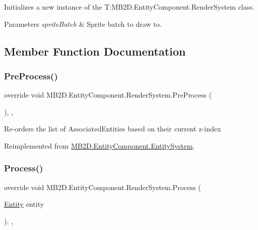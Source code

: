Initializes a new instance of the T\+:\+M\+B2\+D.\+Entity\+Component.\+Render\+System class. 


\begin{DoxyParams}{Parameters}
{\em sprite\+Batch} & Sprite batch to draw to.\\
\hline
\end{DoxyParams}


\subsection{Member Function Documentation}
\hypertarget{class_m_b2_d_1_1_entity_component_1_1_render_system_aadd36efe73a5f8cc489894232a5fc201}{}\label{class_m_b2_d_1_1_entity_component_1_1_render_system_aadd36efe73a5f8cc489894232a5fc201} 
\subsubsection{\texorpdfstring{Pre\+Process()}{PreProcess()}}
{\footnotesize\ttfamily override void M\+B2\+D.\+Entity\+Component.\+Render\+System.\+Pre\+Process (\begin{DoxyParamCaption}{ }\end{DoxyParamCaption})\hspace{0.3cm}{\ttfamily [inline]}, {\ttfamily [protected]}, {\ttfamily [virtual]}}



Re-\/orders the list of Associated\+Entities based on their current z-\/index 



Reimplemented from \hyperlink{class_m_b2_d_1_1_entity_component_1_1_entity_system_aadc002dd04d9cb75775ca955a28e303e}{M\+B2\+D.\+Entity\+Component.\+Entity\+System}.

\hypertarget{class_m_b2_d_1_1_entity_component_1_1_render_system_a015ba5b16cc227c7a5a16fcc1ffa73b7}{}\label{class_m_b2_d_1_1_entity_component_1_1_render_system_a015ba5b16cc227c7a5a16fcc1ffa73b7} 
\subsubsection{\texorpdfstring{Process()}{Process()}}
{\footnotesize\ttfamily override void M\+B2\+D.\+Entity\+Component.\+Render\+System.\+Process (\begin{DoxyParamCaption}\item[{\hyperlink{class_m_b2_d_1_1_entity_component_1_1_entity}{Entity}}]{entity }\end{DoxyParamCaption})\hspace{0.3cm}{\ttfamily [inline]}, {\ttfamily [protected]}, {\ttfamily [virtual]}}



